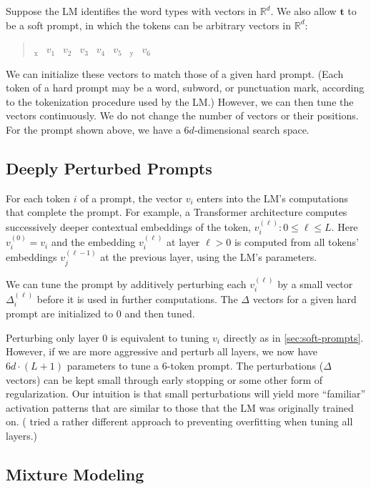 Suppose the LM identifies the word types with vectors in $\mathbb{R}^d$.
We also allow $\mathbf{t}$ to be a soft prompt, in which the tokens can be arbitrary vectors in $\mathbb{R}^d$:

\begin{quote}
\mbox{\underline{}$\!_\mathrm{x}$ $\;v_1$ $\;v_2$ $\;v_3$ $\;v_4$ $\;v_5$ $\;$\underline{}$\!_\mathrm{y}$ $\;v_6$}
\end{quote}

We can initialize these vectors to match those of a given hard prompt.  (Each token of a hard prompt may be a word, subword, or punctuation mark, according to the tokenization procedure used by the LM.)  However, we can then tune the vectors continuously.  We do not change the number of vectors or their positions.  For the prompt shown above, we have a $6d$-dimensional search space.

\subsection{Deeply Perturbed Prompts}\label{sec:deep-soft-prompts}

For each token $i$ of a prompt, the vector $v_i$ enters into the LM's computations that complete the prompt.  For example, a Transformer architecture computes successively deeper contextual embeddings of the token, $v_i^{(\ell)}: 0 \leq \ell \leq L$.  Here $v_i^{(0)} = v_i$ and the embedding $v_i^{(\ell)}$ at layer $\ell > 0$ is computed from all tokens' embeddings $v_j^{(\ell-1)}$ at the previous layer, using the LM's parameters.

We can tune the prompt by additively perturbing each $v_i^{(\ell)}$ by a small vector $\Delta_i^{(\ell)}$ before it is used in further computations.  The $\Delta$ vectors for a given hard prompt are initialized to 0 and then tuned. 

Perturbing only layer 0 is equivalent to tuning $v_i$ directly as in \ref{sec:soft-prompts}.  However, if we are more aggressive and perturb all layers, we now have $6d\cdot(L+1)$ parameters to tune a 6-token prompt.  The perturbations ($\Delta$ vectors) can be kept small through early stopping or some other form of regularization. Our intuition is that small perturbations will yield more ``familiar'' activation patterns that are similar to those that the LM was originally trained on.  (\citet{li2021prefix} tried a rather different approach to preventing overfitting when tuning all layers.)

\subsection{Mixture Modeling}\label{sec:mixture}


